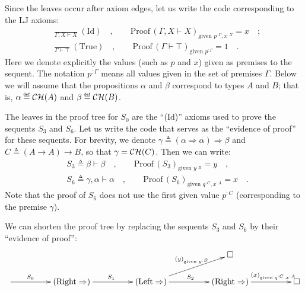 Since the leaves occur after axiom edges, let us write the code corresponding
to the LJ axioms:
\begin{align*}
 & \frac{}{\Gamma,X\vdash X}~(\text{Id})\quad,\quad\quad\text{Proof}\,(\Gamma,X\vdash X)_{\text{given }p^{:\Gamma},x^{:X}}=x\quad;\\
 & \frac{}{\Gamma\vdash\top}~(\text{True})\quad,\quad\quad\text{Proof}\,(\Gamma\vdash\top)_{\text{given }p^{:\Gamma}}=1\quad.
\end{align*}
Here we denote explicitly the values (such as $p$ and $x$) given
as premises to the sequent. The notation $p^{:\Gamma}$ means all
values given in the set of premises $\Gamma$. Below we will assume
that the propositions $\alpha$ and $\beta$ correspond to types $A$
and $B$; that is, $\alpha\triangleq{\cal CH}(A)$ and $\beta\triangleq{\cal CH}(B)$.

The leaves in the proof tree for $S_{0}$ are the \textsf{``}($\text{Id}$)\textsf{''}
axioms used to prove the sequents $S_{3}$ and $S_{6}$. Let us write
the code that serves as the \textsf{``}evidence of proof\textsf{''} for these sequents.
For brevity, we denote $\gamma\triangleq\left(\alpha\Rightarrow\alpha\right)\Rightarrow\beta$
and $C\triangleq\left(A\rightarrow A\right)\rightarrow B$, so that
$\gamma={\cal CH}(C)$. Then we can write:
\begin{align*}
 & S_{3}\triangleq\beta\vdash\beta\quad,\quad\quad\text{Proof}\,(S_{3})_{\text{given }y^{:B}}=y\quad,\\
 & S_{6}\triangleq\gamma,\alpha\vdash\alpha\quad,\quad\quad\text{Proof}\,(S_{6})_{\text{given }q^{:C},x^{:A}}=x\quad.
\end{align*}
Note that the proof of $S_{6}$ does not use the first given value
$p^{:C}$ (corresponding to the premise $\gamma$).

We can shorten the proof tree by replacing the sequents $S_{3}$ and
$S_{6}$ by their \textsf{``}evidence of proof\textsf{''}:
\[
\xymatrix{\xyScaleY{1.5pc}\xyScaleX{4pc} &  &  & \square\\
\ar[r]\sp(0.35){S_{0}} & (\text{Right}\Rightarrow)\ar[r]\sp(0.5){S_{1}} & (\text{Left}\Rightarrow)\ar[r]\sp(0.5){S_{2}}\ar[ru]\sp(0.6){(y)_{\text{given }y^{:B}}} & (\text{Right}\Rightarrow)\ar[r]\sp(0.65){(x)_{\text{given }q^{:C},x^{:A}}} & \square
}
\]

